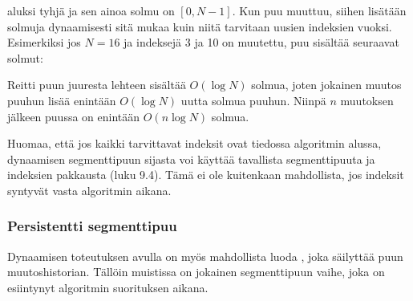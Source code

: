  aluksi tyhjä
ja sen ainoa solmu on $[0,N-1]$.
Kun puu muuttuu, siihen lisätään
solmuja dynaamisesti sitä mukaa kuin niitä tarvitaan
uusien indeksien vuoksi.
Esimerkiksi jos $N=16$ ja indeksejä
3 ja 10 on muutettu,
puu sisältää seuraavat solmut:
\begin{center}
\end{center}

Reitti puun juuresta lehteen sisältää
$O(\log N)$ solmua,
joten jokainen muutos puuhun lisää
enintään $O(\log N)$ uutta solmua puuhun.
Niinpä $n$ muutoksen jälkeen puussa
on enintään $O(n \log N)$ solmua.

Huomaa, että jos kaikki tarvittavat indeksit
ovat tiedossa
algoritmin alussa, dynaamisen segmenttipuun
sijasta voi käyttää tavallista segmenttipuuta
ja indeksien pakkausta (luku 9.4).
Tämä ei ole kuitenkaan mahdollista,
jos indeksit syntyvät vasta algoritmin aikana.

\subsubsection{Persistentti segmenttipuu}


Dynaamisen toteutuksen avulla on myös
mahdollista luoda ,
joka säilyttää puun muutoshistorian.
Tällöin muistissa on jokainen
segmenttipuun vaihe, joka on esiintynyt
algoritmin suorituksen aikana.

